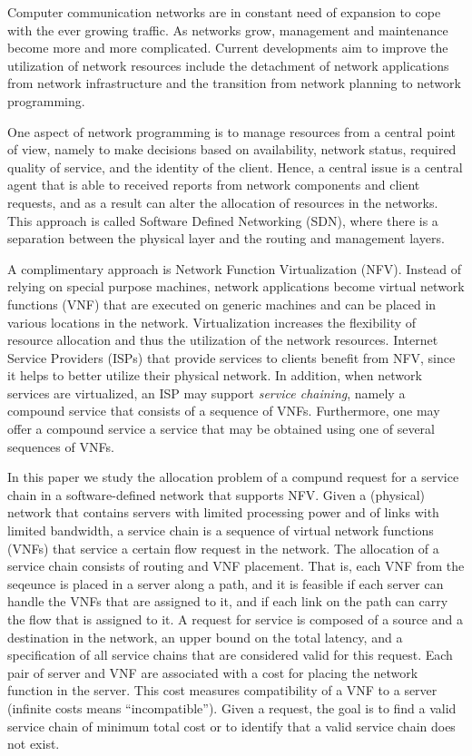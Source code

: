 
Computer communication networks are in constant need of expansion to
cope with the ever growing traffic.  As networks grow, management and
maintenance become more and more complicated.
%
Current developments aim to improve the utilization of network
resources include the detachment of network applications from network
infrastructure and the transition from network planning to network
programming.

One aspect of network programming is to manage resources from a
central point of view, namely to make decisions based on availability,
network status, required quality of service, and the identity of the
client.  Hence, a central issue is a central agent that is able to
received reports from network components and client requests, and as a
result can alter the allocation of resources in the networks.  This
approach is called Software Defined Networking (SDN), where there is a
separation between the physical layer and the routing and management
layers.

A complimentary approach is Network Function Virtualization (NFV).
Instead of relying on special purpose machines, network applications
become virtual network functions (VNF) that are executed on generic
machines and can be placed in various locations in the network.
Virtualization increases the flexibility of resource allocation and
thus the utilization of the network resources.
%
Internet Service Providers (ISPs) that provide services to clients
benefit from NFV, since it helps to better utilize their physical
network.  In addition, when network services are virtualized, an ISP
may support \emph{service chaining}, namely a compound service that
consists of a sequence of VNFs.  Furthermore, one may offer a compound
service a service that may be obtained using one of several sequences
of VNFs.

In this paper we study the allocation problem of a compund request for
a service chain in a software-defined network that supports NFV.
Given a (physical) network that contains servers with limited
processing power and of links with limited bandwidth, a service chain
is a sequence of virtual network functions (VNFs) that service a
certain flow request in the network.
%
The allocation of a service chain consists of routing and VNF
placement.  That is, each VNF from the seqeunce is placed in a server
along a path, and it is feasible if each server can handle the VNFs
that are assigned to it, and if each link on the path can carry the
flow that is assigned to it.
%
A request for service is composed of a source and a destination in the
network, an upper bound on the total latency, and a specification of
all service chains that are considered valid for this request.
%
Each pair of server and VNF are associated with a cost for placing the
network function in the server.  This cost measures compatibility of a
VNF to a server (infinite costs means ``incompatible'').  Given a
request, the goal is to find a valid service chain of minimum total
cost or to identify that a valid service chain does not exist.

